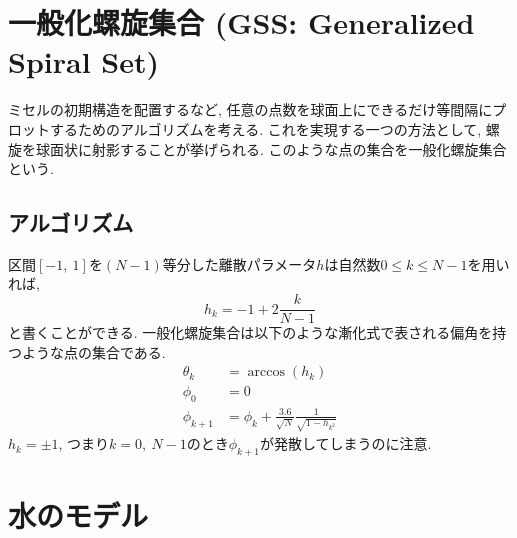 \section{一般化螺旋集合 (GSS: Generalized Spiral Set)}
ミセルの初期構造を配置するなど, 任意の点数を球面上にできるだけ等間隔にプロットするためのアルゴリズムを考える. 
これを実現する一つの方法として, 螺旋を球面状に射影することが挙げられる. 
このような点の集合を一般化螺旋集合という. 

\subsection{アルゴリズム}
区間$[-1,~1]$を$(N-1)$等分した離散パラメータ$h$は自然数$0\le k \le N-1$を用いれば, 
\begin{equation}
    h_{k} = -1 + 2 \frac{k}{N-1}
\end{equation}
と書くことができる. 
一般化螺旋集合は以下のような漸化式で表される偏角を持つような点の集合である. 
\begin{align}
    \theta_{k} &= \arccos(h_{k}) \\
    \phi_{0} &= 0 \\
    \phi_{k+1} &= \phi_{k} + \frac{3.6}{\sqrt{N}} \frac{1}{\sqrt{1-h_{k^{2}}}}
\end{align}
$h_{k} = \pm 1$, つまり$k=0,~N-1$のとき$\phi_{k+1}$が発散してしまうのに注意. 



\clearpage

\section{水のモデル}





% 
% 

